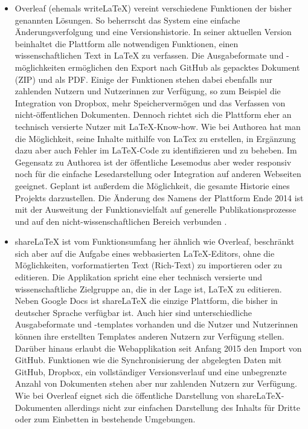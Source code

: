 \begin{itemize}
\item Overleaf (ehemals writeLaTeX) vereint verschiedene Funktionen der bisher genannten Lösungen. So beherrscht das System eine einfache Änderungsverfolgung und eine Versionshistorie. In seiner aktuellen Version beinhaltet die Plattform alle notwendigen Funktionen, einen wissenschaftlichen Text in LaTeX zu verfassen. Die Ausgabeformate und -möglichkeiten ermöglichen den Export nach GitHub als gepacktes Dokument (ZIP) und als PDF. Einige der Funktionen stehen dabei ebenfalls nur zahlenden Nutzern und Nutzerinnen zur Verfügung, so zum Beispiel die Integration von Dropbox, mehr Speichervermögen und das Verfassen von nicht-öffentlichen Dokumenten. Dennoch richtet sich die Plattform eher an technisch versierte Nutzer mit LaTeX-Know-how. Wie bei Authorea hat man die Möglichkeit, seine Inhalte mithilfe von LaTex zu erstellen, in Ergänzung dazu aber auch Fehler im LaTeX-Code zu identifizieren und zu beheben. Im Gegensatz zu Authorea ist der öffentliche Lesemodus aber weder responsiv noch für die einfache Lesedarstellung oder Integration auf anderen Webseiten geeignet. Geplant ist außerdem die Möglichkeit, die gesamte Historie eines Projekts darzustellen. Die Änderung des Namens der Plattform Ende 2014 ist mit der Ausweitung der Funktionsvielfalt auf generelle Publikationsprozesse und auf den nicht-wissenschaftlichen Bereich verbunden \cite{Hammersley_2014}.
\item shareLaTeX ist vom Funktionsumfang her ähnlich wie Overleaf, beschränkt sich aber auf die Aufgabe eines webbasierten LaTeX-Editors, ohne die Möglichkeiten, vorformatierten Text (Rich-Text) zu importieren oder zu editieren. Die Applikation spricht eine eher technisch versierte und wissenschaftliche Zielgruppe an, die in der Lage ist, LaTeX zu editieren. Neben Google Docs ist shareLaTeX die einzige Plattform, die bisher in deutscher Sprache verfügbar ist. Auch hier sind unterschiedliche Ausgabeformate und -templates vorhanden und die Nutzer und Nutzerinnen können ihre erstellten Templates anderen Nutzern zur Verfügung stellen. Darüber hinaus erlaubt die Webapplikation seit Anfang 2015 den Import von GitHub. Funktionen wie die Synchronisierung der abgelegten Daten mit GitHub, Dropbox, ein vollständiger Versionsverlauf und eine unbegrenzte Anzahl von Dokumenten stehen aber nur zahlenden Nutzern zur Verfügung. Wie bei Overleaf eignet sich die öffentliche Darstellung von shareLaTeX-Dokumenten allerdings nicht zur einfachen Darstellung des Inhalts für Dritte oder zum Einbetten in bestehende Umgebungen.

\end{itemize}
